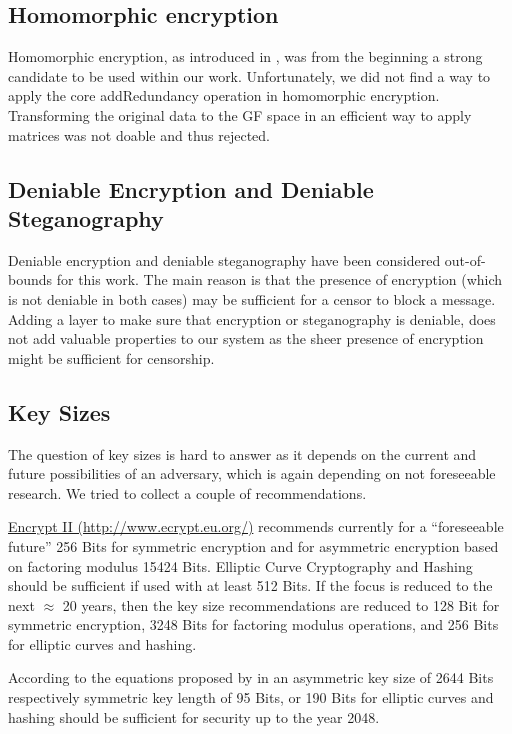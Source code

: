 \subsection{Homomorphic encryption}
Homomorphic encryption, as introduced in \cite{feldman1987practical}, was from the beginning a strong candidate to be used within our work. Unfortunately, we did not find a way to apply the core addRedundancy operation in homomorphic encryption. Transforming the original data to the GF space in an efficient way to apply matrices was not doable and thus rejected.


\subsection{Deniable Encryption and Deniable Steganography}

Deniable encryption and deniable steganography have been considered out-of-bounds for this work. The main reason is that the presence of encryption (which is not deniable in both cases) may be sufficient for a censor to block a message. Adding a layer to make sure that encryption or steganography is deniable, does not add valuable properties to our system as the sheer presence of encryption might be sufficient for censorship. 

\subsection{Key Sizes\label{sec:keySize}}

The question of key sizes is hard to answer as it depends on the current and future possibilities of an adversary, which is again depending on not foreseeable research. We tried to collect a couple of recommendations.

\href{http://www.ecrypt.eu.org/}{Encrypt II (http://www.ecrypt.eu.org/)} recommends currently for a ``foreseeable future'' 256 Bits for symmetric encryption and for asymmetric encryption based on factoring modulus 15424 Bits. Elliptic Curve Cryptography and Hashing should be sufficient if used with at least 512 Bits. If the focus is reduced to the next $\approx$ 20 years, then the key size recommendations are reduced to 128 Bit for symmetric encryption, 3248 Bits for factoring modulus operations, and 256 Bits for elliptic curves and hashing.

According to the equations proposed by \citeauthor{Lenstra04keylength.} in \cite{Lenstra04keylength.} an asymmetric key size of 2644 Bits respectively symmetric key length of 95 Bits, or 190 Bits for elliptic curves and hashing should be sufficient for security up to the year 2048. 

